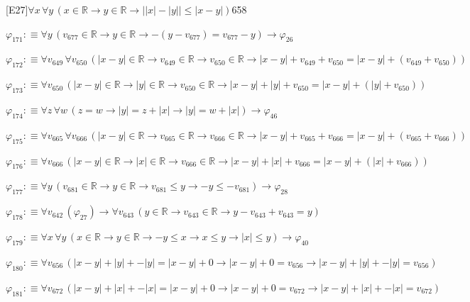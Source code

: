 \begin{fullproof}{[E27]}{$\forall x\,\forall y\,(x \in \mathbb{R} \to y \in \mathbb{R} \to \lvert \lvert x \rvert - \lvert y \rvert \rvert \leq \lvert x - y \rvert)$}{658}
\begin{abbrevlist}
\item $\varphi_{171} :\equiv \forall y\,(v_{677} \in \mathbb{R} \to y \in \mathbb{R} \to -(y - v_{677}) = v_{677} - y) \to \varphi_{26}$
\item $\varphi_{172} :\equiv \forall v_{649}\,\forall v_{650}\,(\lvert x - y \rvert \in \mathbb{R} \to v_{649} \in \mathbb{R} \to v_{650} \in \mathbb{R} \to \lvert x - y \rvert + v_{649} + v_{650} = \lvert x - y \rvert + (v_{649} + v_{650}))$
\item $\varphi_{173} :\equiv \forall v_{650}\,(\lvert x - y \rvert \in \mathbb{R} \to \lvert y \rvert \in \mathbb{R} \to v_{650} \in \mathbb{R} \to \lvert x - y \rvert + \lvert y \rvert + v_{650} = \lvert x - y \rvert + (\lvert y \rvert + v_{650}))$
\item $\varphi_{174} :\equiv \forall z\,\forall w\,(z = w \to \lvert y \rvert = z + \lvert x \rvert \to \lvert y \rvert = w + \lvert x \rvert) \to \varphi_{46}$
\item $\varphi_{175} :\equiv \forall v_{665}\,\forall v_{666}\,(\lvert x - y \rvert \in \mathbb{R} \to v_{665} \in \mathbb{R} \to v_{666} \in \mathbb{R} \to \lvert x - y \rvert + v_{665} + v_{666} = \lvert x - y \rvert + (v_{665} + v_{666}))$
\item $\varphi_{176} :\equiv \forall v_{666}\,(\lvert x - y \rvert \in \mathbb{R} \to \lvert x \rvert \in \mathbb{R} \to v_{666} \in \mathbb{R} \to \lvert x - y \rvert + \lvert x \rvert + v_{666} = \lvert x - y \rvert + (\lvert x \rvert + v_{666}))$
\item $\varphi_{177} :\equiv \forall y\,(v_{681} \in \mathbb{R} \to y \in \mathbb{R} \to v_{681} \leq y \to -y \leq -v_{681}) \to \varphi_{28}$
\item $\varphi_{178} :\equiv \forall v_{642}\,(\varphi_{27}) \to \forall v_{643}\,(y \in \mathbb{R} \to v_{643} \in \mathbb{R} \to y - v_{643} + v_{643} = y)$
\item $\varphi_{179} :\equiv \forall x\,\forall y\,(x \in \mathbb{R} \to y \in \mathbb{R} \to -y \leq x \to x \leq y \to \lvert x \rvert \leq y) \to \varphi_{40}$
\item $\varphi_{180} :\equiv \forall v_{656}\,(\lvert x - y \rvert + \lvert y \rvert + -\lvert y \rvert = \lvert x - y \rvert + 0 \to \lvert x - y \rvert + 0 = v_{656} \to \lvert x - y \rvert + \lvert y \rvert + -\lvert y \rvert = v_{656})$
\item $\varphi_{181} :\equiv \forall v_{672}\,(\lvert x - y \rvert + \lvert x \rvert + -\lvert x \rvert = \lvert x - y \rvert + 0 \to \lvert x - y \rvert + 0 = v_{672} \to \lvert x - y \rvert + \lvert x \rvert + -\lvert x \rvert = v_{672})$

\end{abbrevlist}
\end{fullproof}
